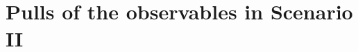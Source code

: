 \documentclass[10pt, a4paper]{article}
\begin{document}
\section*{Pulls of the observables in Scenario II}

\end{document}
